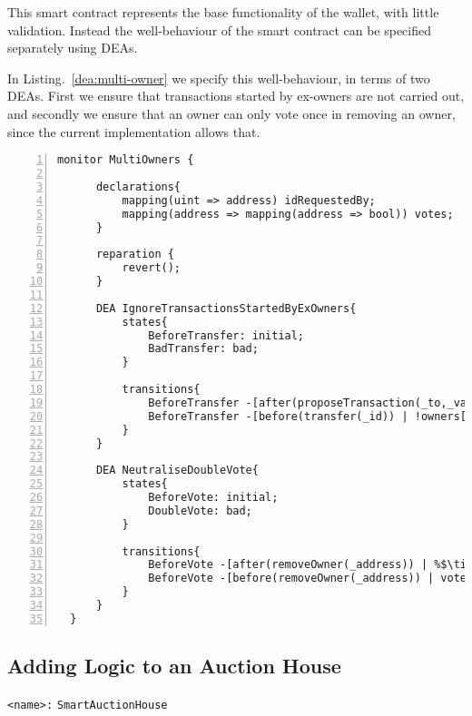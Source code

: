 \documentclass{article}
\newcommand{\tildearrow}{{\raise.37ex\hbox{$\scriptstyle\mathtt{\sim}$}}\hspace{-0.08cm}>\xspace}
\begin{document}
This smart contract represents the base functionality of the wallet, with little validation. Instead the well-behaviour of the smart contract can be specified separately using DEAs. 

In Listing.~\ref{dea:multi-owner} we specify this well-behaviour, in terms of two DEAs. First we ensure that transactions started by ex-owners are not carried out, and secondly we ensure that an owner can only vote once in removing an owner, since the current implementation allows that.

  \small\begin{lstlisting}[language=DEA,basicstyle=\scriptsize,numbers=left,numbersep=2pt,xleftmargin=0.3cm,escapechar=\%,label={dea:multi-owner},caption={A monitor that checks that transactions started by ex-owners are not fulfilled, and that owners can only vote once.}]
  monitor MultiOwners {
  
      declarations{
          mapping(uint => address) idRequestedBy;
          mapping(address => mapping(address => bool)) votes;
      }
  
      reparation {
          revert();
      }
  
      DEA IgnoreTransactionsStartedByExOwners{
          states{
              BeforeTransfer: initial;
              BadTransfer: bad;
          }
  
          transitions{
              BeforeTransfer -[after(proposeTransaction(_to,_val)) | %$\tildearrow$% idRequestedBy[--id] = msg.sender;]-> BeforeTransfer;
              BeforeTransfer -[before(transfer(_id)) | !owners[idRequestedBy[id]]]-> BadTransfer;
          }
      }
  
      DEA NeutraliseDoubleVote{
          states{
              BeforeVote: initial;
              DoubleVote: bad;
          }
  
          transitions{
              BeforeVote -[after(removeOwner(_address)) | %$\tildearrow$% votes[_address][msg.sender] = true;]-> BeforeVote;
              BeforeVote -[before(removeOwner(_address)) | votes[_address][msg.sender]]-> DoubleVote;
          }
      }
  }
 \end{lstlisting}\normalsize


\subsection{Adding Logic to an Auction House}
         \texttt{<name>:} \verb+SmartAuctionHouse+\\
 
\end{document}
